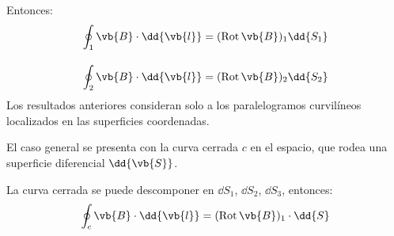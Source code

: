 \par
Entonces:
\begin{align*}
\oint_{1} \vb{B} \cdot \dd{\vb{l}} &= ({\rm{Rot}} \, \vb{B})_{1} \dd{S_{1}} \\[1em]
\oint_{2} \vb{B} \cdot \dd{\vb{l}} &= ({\rm{Rot}} \, \vb{B})_{2} \dd{S_{2}}
\end{align*}
Los resultados anteriores consideran solo a los paralelogramos curvilíneos localizados en las superficies coordenadas.
\par
El caso general se presenta con la curva cerrada $c$ en el espacio, que rodea una superficie diferencial $\dd{\vb{S}}$.
\par
La curva cerrada se puede descomponer en $\dd{S_{1}}$, $\dd{S_{2}}$, $\dd{S_{3}}$, entonces:
\begin{align*}
\oint_{c} \vb{B} \cdot \dd{\vb{l}} = ({\rm{Rot}} \, \vb{B})_{1} \cdot \dd{S} 
\end{align*}
